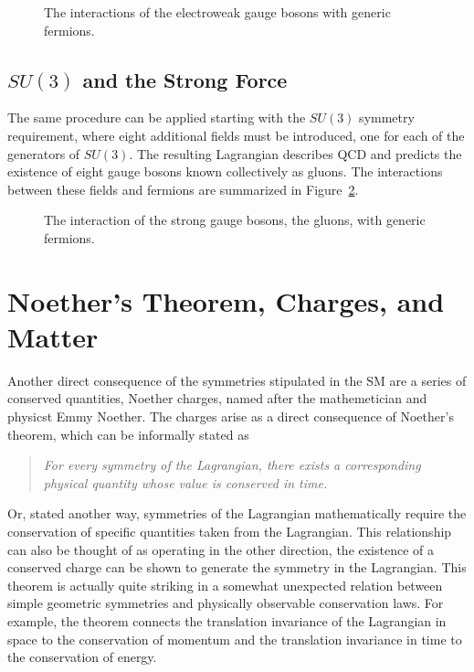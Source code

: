 \begin{figure}
\caption{The interactions of the electroweak gauge bosons with generic fermions.} 
\label{fig:feyn_electroweak}
\end{figure}

\subsection{$SU(3)$ and the Strong Force}

The same procedure can be applied starting with the $SU(3)$ symmetry requirement, where eight additional fields must be introduced, one for each of the generators of $SU(3)$.
The resulting Lagrangian describes \ac{QCD} and predicts the existence of eight gauge bosons known collectively as gluons. 
The interactions between these fields and fermions are summarized in Figure~\ref{fig:feyn_strong}.

\begin{figure}
\caption{The interaction of the strong gauge bosons, the gluons, with generic fermions.} 
\label{fig:feyn_strong}
\end{figure}


\section{Noether's Theorem, Charges, and Matter}

Another direct consequence of the symmetries stipulated in the \ac{SM} are a series of conserved quantities, Noether charges, named after the mathemetician and physicst Emmy Noether.
The charges arise as a direct consequence of Noether's theorem, which can be informally stated as 
\begin{quote}
\textit{For every symmetry of the Lagrangian, there exists a corresponding physical quantity whose value is conserved in time.}
\end{quote}
\noindent Or, stated another way, symmetries of the Lagrangian mathematically require the conservation of specific quantities taken from the Lagrangian. 
This relationship can also be thought of as operating in the other direction, the existence of a conserved charge can be shown to generate the symmetry in the Lagrangian.
This theorem is actually quite striking in a somewhat unexpected relation between simple geometric symmetries and physically observable conservation laws. 
For example, the theorem connects the translation invariance of the Lagrangian in space to the conservation of momentum and the translation invariance in time to the conservation of energy. 

